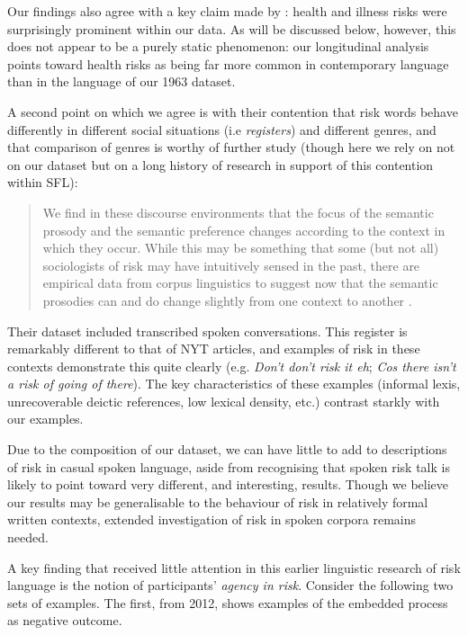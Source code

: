         Our findings also agree with a key claim made by : health and illness risks were surprisingly prominent within our data. As will be discussed below, however, this does not appear to be a purely static phenomenon: our longitudinal analysis points toward health risks as being far more common in contemporary language than in the language of our 1963 dataset.

        A second point on which we agree is with their contention that risk words behave differently in different social situations (i.e \emph{registers}) and different genres, and that comparison of genres is worthy of further study (though here we rely on not on our dataset but on a long history of research in support of this contention within SFL):

        \begin{quote} \small \singlespacing
        We find in these discourse environments that the focus of the semantic prosody and the semantic preference changes according to the context in which they occur. While this may be something that some (but not all) sociologists of risk may have intuitively sensed in the past, there are empirical data from corpus linguistics to suggest now that the semantic prosodies can and do change slightly from one context to another \citeyear[p.~177]{hamilton_meanings_2007}.
        \end{quote}
        Their dataset included transcribed spoken conversations. This register is remarkably different to that of NYT articles, and examples of risk in these contexts demonstrate this quite clearly (e.g. \emph{Don't don't risk it eh}; \emph{Cos there isn't a risk of going of there}). The key characteristics of these examples (informal lexis, unrecoverable deictic references, low lexical density, etc.) contrast starkly with our examples.

        Due to the composition of our dataset, we can have little to add to descriptions of risk in casual spoken language, aside from recognising that spoken risk talk is likely to point toward very different, and interesting, results. Though we believe our results may be generalisable to the behaviour of risk in relatively formal written contexts, extended investigation of risk in spoken corpora remains needed.

        A key finding that received little attention in this earlier linguistic research of risk language is the notion of participants' \emph{agency in risk}. Consider the following two sets of examples. The first, from 2012, shows examples of the embedded process as negative outcome.


